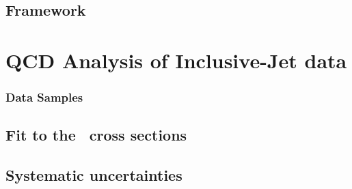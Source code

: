 \subsection{\fastnlo Framework}
\label{subsec:fastnlo}


%

\section{QCD Analysis of Inclusive-Jet data}
\label{sec:aspdffit}

\subsubsection{Data Samples}
\label{subsec:aspdffitdata}


\subsection{Fit to the \dsdetjetb~cross sections}
\label{subsec:doubledifasfit}



\subsection{Systematic uncertainties}
\label{subsec:assysunc}

